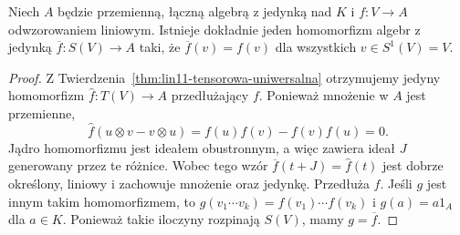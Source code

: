 \begin{twierdzenie}
\label{thm:lin11-sym-uniwersalna}
Niech \(A\) będzie przemienną,
łączną algebrą z jedynką nad \(K\)
i \(f\colon V\to A\) odwzorowaniem
liniowym. Istnieje dokładnie jeden
homomorfizm algebr z jedynką
\(\overline f\colon S(V)\to A\)
taki, że \(\overline f(v)=f(v)\)
dla wszystkich \(v\in S^1(V)=V\).
\end{twierdzenie}
\begin{proof}
Z Twierdzenia~\ref{thm:lin11-tensorowa-uniwersalna}
otrzymujemy jedyny homomorfizm
\(\widehat f\colon T(V)\to A\)
przedłużający \(f\).
Ponieważ mnożenie w \(A\)
jest przemienne,
\[
 \widehat f(u\otimes v-v\otimes u)
 =f(u)f(v)-f(v)f(u)=0.
\]
Jądro homomorfizmu jest
ideałem obustronnym, a więc
zawiera ideał \(J\) generowany
przez te różnice.
Wobec tego wzór
\(\overline f(t+J)=\widehat f(t)\)
jest dobrze określony, liniowy
i zachowuje mnożenie oraz jedynkę.
Przedłuża \(f\).
Jeśli \(g\) jest innym takim
homomorfizmem, to
\(g(v_1\cdots v_k)
=f(v_1)\cdots f(v_k)\)
i \(g(a)=a1_A\) dla \(a\in K\).
Ponieważ takie iloczyny
rozpinają \(S(V)\), mamy
\(g=\overline f\).
\end{proof}

